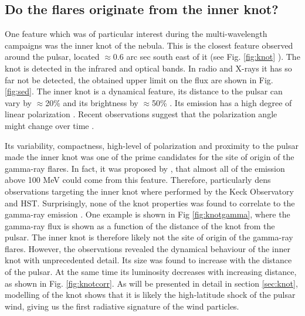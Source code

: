 \subsection{Do the flares originate from the inner knot?} 

One feature which was of particular interest during the multi-wavelength campaigns was the inner knot of the nebula. This is the closest feature observed around the pulsar, located $\approx$0.6 arc sec south east of it (see Fig. \ref{fig:knot} ). The knot is detected in the infrared and optical bands. In radio and X-rays it has so far not be detected, the obtained upper limit on the flux are shown in Fig. \ref{fig:sed}. The inner knot is a dynamical feature, its distance to the pulsar can vary by $\approx$20\%  and its brightness by $\approx$50\% \cite{Sandberg2009}.  Its emission has a high degree of linear polarization \cite{Moran_2013}. Recent observations suggest that the polarization angle might change over time \cite{Moran_2015} . 

Its variability, compactness, high-level of polarization and proximity to the pulsar made the inner knot was one of the prime candidates for the site of origin of the gamma-ray flares.  In fact, it was proposed by \citet{komissarov2011}, that almost all of the emission above 100 MeV could come from this feature. Therefore, particularly dens observations targeting the inner knot where performed by the Keck Observatory and HST. Surprisingly, none of the knot properties was found to correlate to the gamma-ray emission \cite{rudy2015}. One example is shown in Fig \ref{fig:knotgamma},  where the gamma-ray flux is shown as a function of the distance of the knot from the pulsar. The inner knot is therefore likely not the site of origin of the gamma-ray flares. However, the observations revealed the dynamical behaviour of the inner knot with unprecedented detail. Its size was found to increase with the distance of the pulsar. At the same time its luminosity decreases with increasing distance, as shown in Fig. \ref{fig:knotcorr}.  As will be presented in detail in section \ref{sec:knot}, modelling of the knot shows that it is likely the high-latitude shock of the pulsar wind, giving us the first radiative signature of the wind particles.